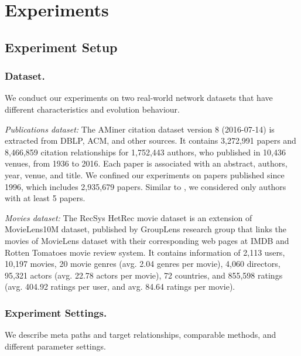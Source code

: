 \section{Experiments}



\subsection{Experiment Setup}

\subsubsection{Dataset.} We conduct our experiments on two real-world network datasets that have different characteristics and evolution behaviour. 

\textit{Publications dataset:} The AMiner citation dataset \cite{Tang:08KDD} version 8 (2016-07-14) is extracted from DBLP, ACM, and other sources. It contains 3,272,991 papers and 8,466,859 citation relationships for 1,752,443 authors, who published in 10,436 venues, from 1936 to 2016. Each paper is associated with an abstract, authors, year, venue, and title. We confined our experiments on papers published since 1996, which includes 2,935,679 papers. Similar to \cite{sun2011ASONAM}, we considered only authors with at least 5 papers.
    
\textit{Movies dataset:} The RecSys HetRec movie dataset \cite{Cantador:RecSys2011} is an extension of MovieLens10M dataset, published by GroupLens research group that links the movies of MovieLens dataset with their corresponding web pages at IMDB and Rotten Tomatoes movie review system. It contains information of 2,113 users, 10,197 movies, 20 movie genres (avg. 2.04 genres per movie), 4,060 directors, 95,321 actors (avg. 22.78 actors per movie), 72 countries, and 855,598 ratings (avg. 404.92 ratings per user, and avg. 84.64 ratings per movie).%


\subsubsection{Experiment Settings.} We describe meta paths and target relationships, comparable methods, and different parameter settings.

